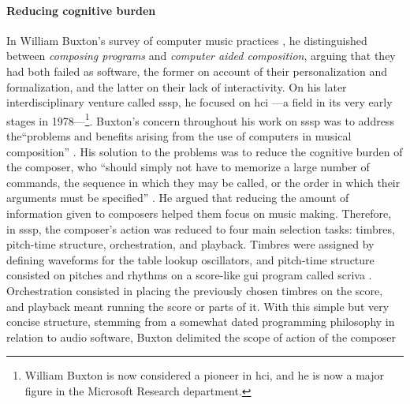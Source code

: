 \documentclass[
]{book}
\begin{document}
\paragraph{Reducing cognitive burden}
In William Buxton's survey of computer music practices \parencites{Bux77:Aco}{icmc/bbp2372.1978.012}{DBLP:conf/icmc/BuxtonPRB80}, he distinguished between \textit{composing programs} and \textit{computer aided composition}, arguing that they had both failed as software, the former on account of their personalization and formalization, and the latter on their lack of interactivity. On his later interdisciplinary venture called \gls{sssp}, he focused on \gls{hci} ---a field in its very early stages in 1978---\footnote{William Buxton is now considered a pioneer in \gls{hci}, and he is now a major figure in the Microsoft Research department.}. Buxton's concern throughout his work on \gls{sssp} was to address the``problems and benefits arising from the use of computers in musical composition'' \parencite[472]{DBLP:conf/icmc/BuxtonFBRSCM78}. His solution to the problems was to reduce the cognitive burden of the composer, who ``should simply not have to memorize a large number of commands, the sequence in which they may be called, or the order in which their arguments must be specified'' \parencite[474]{DBLP:conf/icmc/BuxtonFBRSCM78}. He argued that reducing the amount of information given to composers helped them focus on music making. Therefore, in \gls{sssp}, the composer's action was reduced to four main selection tasks: timbres, pitch-time structure, orchestration, and playback. Timbres were assigned by defining waveforms for the table lookup oscillators, and pitch-time structure consisted on pitches and rhythms on a score-like \gls{gui} program called \gls{scriva} \parencite{youtube/buxton10}. Orchestration consisted in placing the previously chosen timbres on the score, and playback meant running the score or parts of it. With this simple but very concise structure, stemming from a somewhat dated programming philosophy in relation to audio software, Buxton delimited the scope of action of the composer
\end{document}
